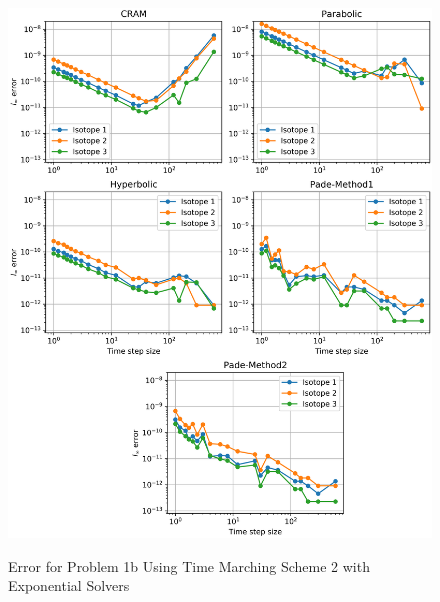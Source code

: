 \begin{figure}[t]
  \centering
  \includegraphics[width=6.5in]{images/problem1bMethod2.png}\\
  \caption{Error for Problem 1b Using Time Marching Scheme 2 with Exponential Solvers}
  \label{fig:errorProblem1bTimeMarchingScheme2}
\end{figure} 

